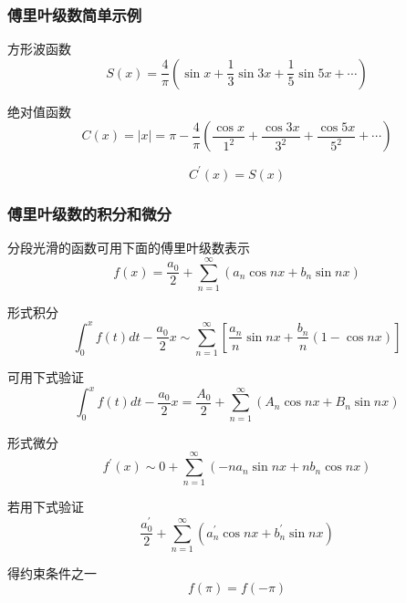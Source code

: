 \documentclass{beamer}
\begin{document}
\begin{CJK}{UTF8}{song}

\begin{frame}[allowframebreaks]
\frametitle{傅里叶级数简单示例}

方形波函数
\begin{equation}
S(x)=\frac{4}{\pi}\left(\sin x+\frac{1}{3} \sin 3 x+\frac{1}{5} \sin 5 x+\cdots\right)
\end{equation}

绝对值函数
\begin{equation}
C(x)=|x|=\pi-\frac{4}{\pi}\left(\frac{\cos x}{1^{2}}+\frac{\cos 3 x}{3^{2}}+\frac{\cos 5 x}{5^{2}}+\cdots\right)
\end{equation}

\begin{equation}
C^{\prime}(x)=S(x)
\end{equation}
\end{frame}

\begin{frame}[allowframebreaks]
\frametitle{傅里叶级数的积分和微分}

分段光滑的函数可用下面的傅里叶级数表示
\begin{equation}
f(x)=\frac{a_{0}}{2}+\sum_{n=1}^{\infty}\left(a_{n} \cos n x+b_{n} \sin n x\right)
\end{equation}

形式积分
\begin{equation}
\int_{0}^{x} f(t) d t-\frac{a_{0}}{2} x \sim \sum_{n=1}^{\infty}\left[\frac{a_{n}}{n} \sin n x+\frac{b_{n}}{n}(1-\cos n x)\right]
\end{equation}

可用下式验证
\begin{equation}
\int_{0}^{x} f(t) d t-\frac{a_{0}}{2} x=\frac{A_{0}}{2}+\sum_{n=1}^{\infty}\left(A_{n} \cos n x+B_{n} \sin n x\right)
\end{equation}

形式微分
\begin{equation}
f^{\prime}(x) \sim 0+\sum_{n=1}^{\infty}\left(-n a_{n} \sin n x+n b_{n} \cos n x\right)
\end{equation}

若用下式验证
\begin{equation}
\frac{a_{0}^{\prime}}{2}+\sum_{n=1}^{\infty}\left(a_{n}^{\prime} \cos n x+b_{n}^{\prime} \sin n x\right)
\end{equation}

得约束条件之一
\begin{equation}
f(\pi)=f(-\pi)
\end{equation}
\end{frame}


\end{CJK}
\end{document}
